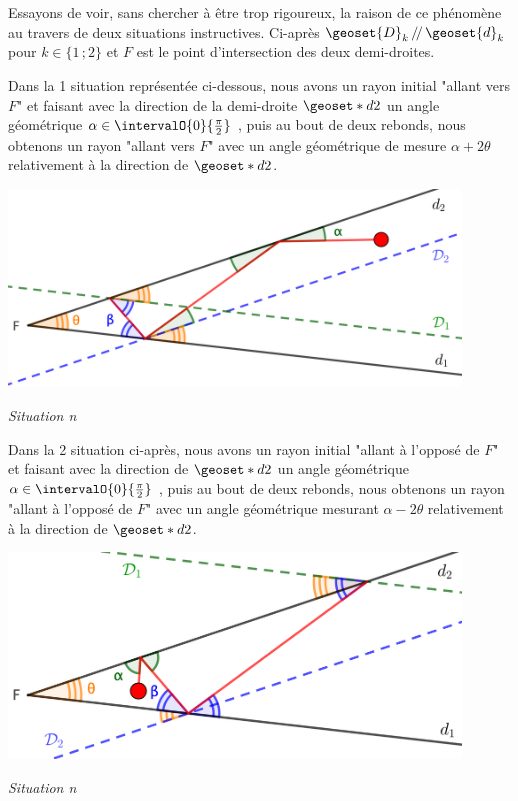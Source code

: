 Essayons de voir, sans chercher à être trop rigoureux, la raison de ce phénomène au travers de deux situations instructives. Ci-après $\geoset{D}_k \, /\!/ \, \geoset{d}_k$ pour $k \in \{ 1 \,; 2\}$ et $F$ est le point d'intersection des deux demi-droites.


\medskip


Dans la 1\iere{} situation représentée ci-dessous, nous avons un rayon initial "allant vers $F$" et faisant avec la direction de la demi-droite $\geoset*{d}{2}$ un angle géométrique $\alpha \in \intervalO{0}{\frac{\pi}{2}}$ , puis au bout de deux rebonds, nous obtenons un rayon "allant vers $F$" avec un angle géométrique de mesure $\alpha + 2\theta$ relativement à la direction de $\geoset*{d}{2}$.


\medskip


\begin{center}
	\includegraphics[width=12cm]{basic-math-pool/analysis-1.png}
	
	\itshape\small
	Situation n
	\label{situtation-1}
\end{center}


\medskip


Dans la 2\ieme{} situation ci-après, nous avons un rayon initial "allant à l'opposé de $F$" et faisant  avec la direction de $\geoset*{d}{2}$ un angle géométrique $\alpha \in \intervalO{0}{\frac{\pi}{2}}$ , puis au bout de deux rebonds, nous obtenons un rayon "allant à l'opposé de $F$" avec un angle géométrique mesurant $\alpha - 2\theta$ relativement à la direction de $\geoset*{d}{2}$.


\medskip


\begin{center}
	\includegraphics[width=12cm]{basic-math-pool/analysis-2.png}
	
	\itshape\small
	Situation n
	\label{situtation-2}
\end{center}


